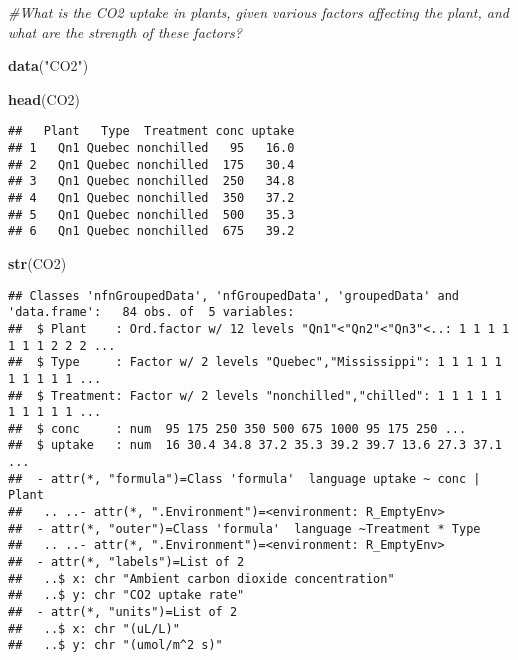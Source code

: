 \documentclass[
]{article}
\author{}
\date{\vspace{-2.5em}}
\newenvironment{Shaded}{\begin{snugshade}}{\end{snugshade}}
\newcommand{\CommentTok}[1]{\textcolor[rgb]{0.56,0.35,0.01}{\textit{#1}}}
\newcommand{\FunctionTok}[1]{\textcolor[rgb]{0.13,0.29,0.53}{\textbf{#1}}}
\newcommand{\NormalTok}[1]{#1}
\newcommand{\StringTok}[1]{\textcolor[rgb]{0.31,0.60,0.02}{#1}}
\begin{document}
\begin{Shaded}
\begin{Highlighting}[]
\CommentTok{\#What is the CO2 uptake in plants, given various factors affecting the plant, and what are the strength of these factors?}
\end{Highlighting}
\end{Shaded}

\begin{Shaded}
\begin{Highlighting}[]
\FunctionTok{data}\NormalTok{(}\StringTok{"CO2"}\NormalTok{)}

\FunctionTok{head}\NormalTok{(CO2)}
\end{Highlighting}
\end{Shaded}

\begin{verbatim}
##   Plant   Type  Treatment conc uptake
## 1   Qn1 Quebec nonchilled   95   16.0
## 2   Qn1 Quebec nonchilled  175   30.4
## 3   Qn1 Quebec nonchilled  250   34.8
## 4   Qn1 Quebec nonchilled  350   37.2
## 5   Qn1 Quebec nonchilled  500   35.3
## 6   Qn1 Quebec nonchilled  675   39.2
\end{verbatim}

\begin{Shaded}
\begin{Highlighting}[]
\FunctionTok{str}\NormalTok{(CO2)}
\end{Highlighting}
\end{Shaded}

\begin{verbatim}
## Classes 'nfnGroupedData', 'nfGroupedData', 'groupedData' and 'data.frame':   84 obs. of  5 variables:
##  $ Plant    : Ord.factor w/ 12 levels "Qn1"<"Qn2"<"Qn3"<..: 1 1 1 1 1 1 1 2 2 2 ...
##  $ Type     : Factor w/ 2 levels "Quebec","Mississippi": 1 1 1 1 1 1 1 1 1 1 ...
##  $ Treatment: Factor w/ 2 levels "nonchilled","chilled": 1 1 1 1 1 1 1 1 1 1 ...
##  $ conc     : num  95 175 250 350 500 675 1000 95 175 250 ...
##  $ uptake   : num  16 30.4 34.8 37.2 35.3 39.2 39.7 13.6 27.3 37.1 ...
##  - attr(*, "formula")=Class 'formula'  language uptake ~ conc | Plant
##   .. ..- attr(*, ".Environment")=<environment: R_EmptyEnv> 
##  - attr(*, "outer")=Class 'formula'  language ~Treatment * Type
##   .. ..- attr(*, ".Environment")=<environment: R_EmptyEnv> 
##  - attr(*, "labels")=List of 2
##   ..$ x: chr "Ambient carbon dioxide concentration"
##   ..$ y: chr "CO2 uptake rate"
##  - attr(*, "units")=List of 2
##   ..$ x: chr "(uL/L)"
##   ..$ y: chr "(umol/m^2 s)"
\end{verbatim}
\end{document}
